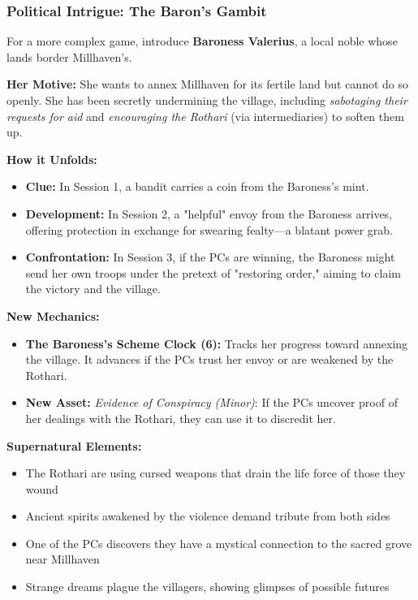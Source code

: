 \documentclass[11pt]{article}
\newenvironment{mechanic}[1]{%
  \begin{mdframed}[backgroundcolor=tableheader, linewidth=1pt, linecolor=accentcolor]%
  \subsubsection*{#1}%
}{%
  \end{mdframed}%
}
\begin{document}
\begin{mechanic}{Political Intrigue: The Baron's Gambit}

For a more complex game, introduce \textbf{Baroness Valerius}, a local noble whose lands border Millhaven's.

\textbf{Her Motive:} She wants to annex Millhaven for its fertile land but cannot do so openly. She has been secretly undermining the village, including \textit{sabotaging their requests for aid} and \textit{encouraging the Rothari} (via intermediaries) to soften them up.

\textbf{How it Unfolds:}
\begin{itemize}
\item \textbf{Clue:} In Session 1, a bandit carries a coin from the Baroness's mint.
\item \textbf{Development:} In Session 2, a "helpful" envoy from the Baroness arrives, offering protection in exchange for swearing fealty—a blatant power grab.
\item \textbf{Confrontation:} In Session 3, if the PCs are winning, the Baroness might send her own troops under the pretext of "restoring order," aiming to claim the victory and the village.
\end{itemize}

\textbf{New Mechanics:}
\begin{itemize}
\item \textbf{The Baroness's Scheme Clock (6):} Tracks her progress toward annexing the village. It advances if the PCs trust her envoy or are weakened by the Rothari.
\item \textbf{New Asset:} \textit{Evidence of Conspiracy (Minor)}: If the PCs uncover proof of her dealings with the Rothari, they can use it to discredit her.
\end{itemize}

\end{mechanic}

\textbf{Supernatural Elements:}
\begin{itemize}
\item The Rothari are using cursed weapons that drain the life force of those they wound
\item Ancient spirits awakened by the violence demand tribute from both sides
\item One of the PCs discovers they have a mystical connection to the sacred grove near Millhaven
\item Strange dreams plague the villagers, showing glimpses of possible futures
\end{itemize}
\end{document}
